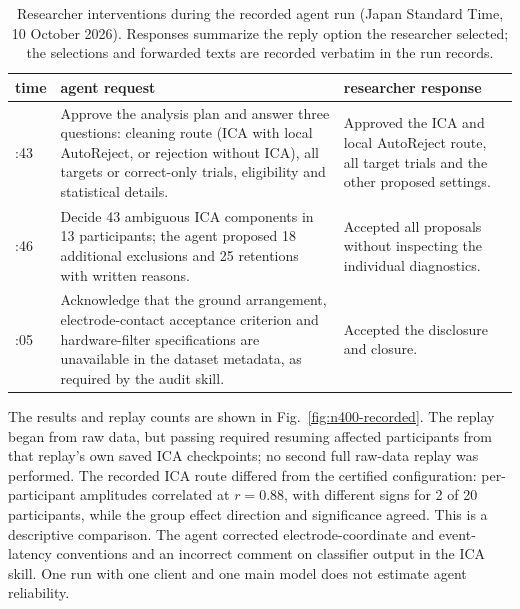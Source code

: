 \begin{table}[!htbp]
\centering\footnotesize
\caption{Researcher interventions during the recorded agent run (Japan Standard Time, 10 October 2026). Responses summarize the reply option the researcher selected; the selections and forwarded texts are recorded verbatim in the run records.}
\label{tab:interventions}
\begin{tabular}{>{\raggedright\arraybackslash}p{1.3cm}>{\raggedright\arraybackslash}p{6.6cm}>{\raggedright\arraybackslash}p{6.3cm}}
\toprule
time & agent request & researcher response \\
\midrule
15:43 & Approve the analysis plan and answer three questions: cleaning route (ICA with local AutoReject, or rejection without ICA), all targets or correct-only trials, eligibility and statistical details. & Approved the ICA and local AutoReject route, all target trials and the other proposed settings. \\
16:46 & Decide 43 ambiguous ICA components in 13 participants; the agent proposed 18 additional exclusions and 25 retentions with written reasons. & Accepted all proposals without inspecting the individual diagnostics. \\
18:05 & Acknowledge that the ground arrangement, electrode-contact acceptance criterion and hardware-filter specifications are unavailable in the dataset metadata, as required by the audit skill. & Accepted the disclosure and closure. \\
\bottomrule
\end{tabular}
\end{table}
The results and replay counts are shown in Fig.~\ref*{fig:n400-recorded}. The replay began from raw data, but passing required resuming affected participants from that replay's own saved ICA checkpoints; no second full raw-data replay was performed. The recorded ICA route differed from the certified configuration: per-participant amplitudes correlated at $r=0.88$, with different signs for 2 of 20 participants, while the group effect direction and significance agreed. This is a descriptive comparison. The agent corrected electrode-coordinate and event-latency conventions and an incorrect comment on classifier output in the ICA skill. One run with one client and one main model does not estimate agent reliability.

\FloatBarrier
{}
